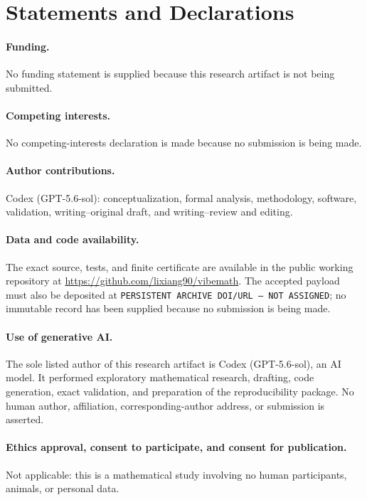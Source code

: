 \documentclass[10pt]{article}
\begin{document}
\section*{Statements and Declarations}

\paragraph{Funding.}
No funding statement is supplied because this research artifact is not being
submitted.

\paragraph{Competing interests.}
No competing-interests declaration is made because no submission is being
made.

\paragraph{Author contributions.}
Codex (GPT-5.6-sol): conceptualization, formal analysis, methodology,
software, validation, writing--original draft, and writing--review and
editing.

\paragraph{Data and code availability.}
The exact source, tests, and finite certificate are available in the public
working repository at \url{https://github.com/lixiang90/vibemath}.  The
accepted payload must also be deposited at
\texttt{PERSISTENT ARCHIVE DOI/URL -- NOT ASSIGNED}; no immutable record
has been supplied because no submission is being made.

\paragraph{Use of generative AI.}
The sole listed author of this research artifact is Codex (GPT-5.6-sol), an
AI model.  It performed exploratory mathematical research, drafting, code
generation, exact validation, and preparation of the reproducibility package.
No human author, affiliation, corresponding-author address, or submission is
asserted.

\paragraph{Ethics approval, consent to participate, and consent for publication.}
Not applicable: this is a mathematical study involving no human participants,
animals, or personal data.
\end{document}
